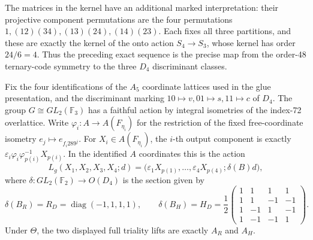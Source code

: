 The matrices in the kernel have an additional marked interpretation:
their projective component permutations are the four permutations
\(1,(12)(34),(13)(24),(14)(23)\).  Each fixes all three partitions, and
these are exactly the kernel of the onto action \(S_4\to S_3\), whose
kernel has order \(24/6=4\).  Thus the preceding exact sequence is the
precise map from the order-48 ternary-code symmetry to the three
\(D_4\) discriminant classes.

\begin{theorem}
\label{esn:thm:gl2-full-lattice-lift}
Fix the four identifications of the \(A_5\) coordinate lattices used in
the glue presentation, and the discriminant marking
\(10\mapsto v,01\mapsto s,11\mapsto c\) of \(D_4\).
The group \(G\cong GL_2(\mathbb F_3)\) has a faithful action by integral
isometries of the index-72 overlattice.  Write
\(\varphi_i:A\longrightarrow A(F_{\eta_i})\) for the restriction of
the fixed free-coordinate isometry \(e_j\mapsto e_{f_i289^j}\).
For \(X_i\in A(F_{\eta_i})\), the \(i\)-th output component is exactly
\(\varepsilon_i\varphi_i\varphi_{p(i)}^{-1}X_{p(i)}\).
In the identified \(A\) coordinates this is the action
\[
 L_g(X_1,X_2,X_3,X_4;d)
 =\bigl(\varepsilon_1X_{p(1)},\ldots,
        \varepsilon_4X_{p(4)};\delta(B)d\bigr),
\]
where \(\delta:GL_2(\mathbb F_2)\to O(D_4)\) is the section given by
\[
 \delta(B_R)=R_D=\operatorname{diag}(-1,1,1,1),\qquad
 \delta(B_H)=H_D=\frac12
 \begin{pmatrix}
 1&1&1&1\\1&1&-1&-1\\1&-1&1&-1\\1&-1&-1&1
 \end{pmatrix}.
\]
Under \(\Theta\), the two displayed full triality lifts are exactly
\(A_R\) and \(A_H\).
\end{theorem}

